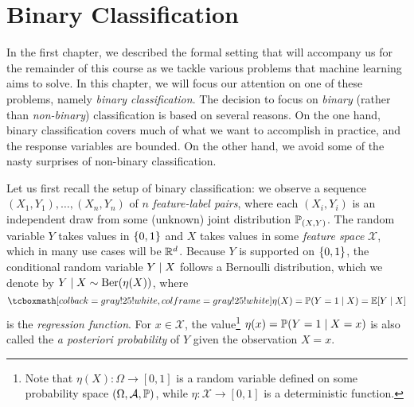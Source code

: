 \chapter{Binary Classification}
\label{ch: binary classification}

In the first chapter, we described the formal setting that will accompany us for the remainder of this course as we tackle various problems that machine learning aims to solve. In this chapter, we will focus our attention on one of these problems, namely \emph{binary classification}. The decision to focus on \emph{binary} (rather than \emph{non-binary}) classification is based on several reasons. On the one hand, binary classification covers much of what we want to accomplish in practice, and the response variables are bounded. On the other hand, we avoid some of the nasty surprises of non-binary classification.

Let us first recall the setup of binary classification: we observe a sequence $(X_1, Y_1), \dots, (X_n, Y_n)$ of $n$ \emph{feature-label pairs}, where each $(X_i, Y_i)$ is an independent draw from some (unknown) joint distribution $\P_{(X, Y)}$. The random variable $Y$ takes values in $\set{0, 1}$ and $X$ takes values in some \emph{feature space} $\mathcal{X}$, which in many use cases will be $\R^d$. Because $Y$ is supported on $\set{0, 1}$, the conditional random variable $Y \given X$ follows a Bernoulli distribution, which we denote by $Y \given X \sim \Ber(\eta(X))$, where
\[
    \highlightMath{
        \eta(X) = \P(Y = 1 \given X) = \Exp[Y \given X]
    }
\]
is the \emph{regression function}. For $x \in \mathcal{X}$, the value\footnote{Note that $\eta(X) \colon \Omega \to [0, 1]$ is a random variable defined on some probability space $(\Omega, \mathcal{A}, \P)$, while $\eta \colon \mathcal{X} \to [0, 1]$ is a deterministic function.} $\eta(x) = \P(Y = 1 \given X = x)$ is also called the \emph{a posteriori probability} of $Y$ given the observation $X = x$.
